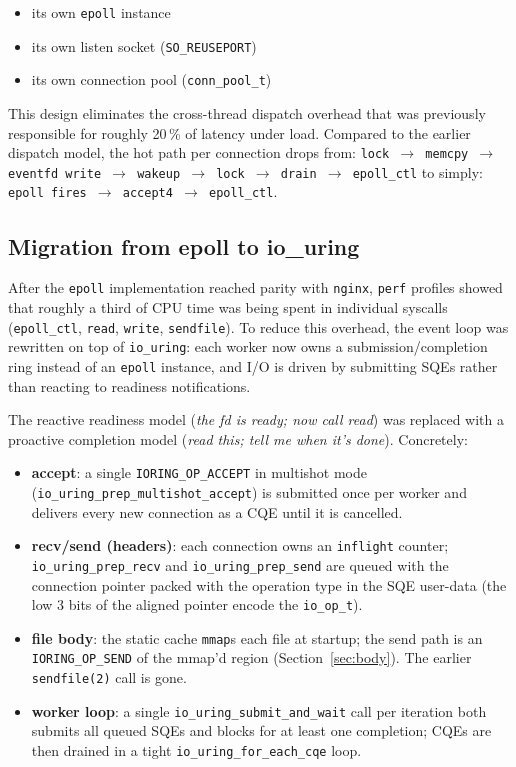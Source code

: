 \documentclass{article}
\begin{document}
\begin{itemize}
    \item its own \texttt{epoll} instance
    \item its own listen socket (\texttt{SO\_REUSEPORT})
    \item its own connection pool (\texttt{conn\_pool\_t})
\end{itemize}

This design eliminates the cross-thread dispatch overhead that was previously responsible for
roughly 20\,\% of latency under load. Compared to the earlier dispatch model, the hot path
per connection drops from: \texttt{lock $\to$ memcpy $\to$ eventfd write $\to$ wakeup $\to$
lock $\to$ drain $\to$ epoll\_ctl} to simply: \texttt{epoll fires $\to$ accept4 $\to$
epoll\_ctl}.

\subsection{Migration from epoll to io\_uring}
\label{sec:iouring}

After the \texttt{epoll} implementation reached parity with \texttt{nginx}, \texttt{perf} profiles showed that roughly a third of CPU time was being spent in individual syscalls (\texttt{epoll\_ctl}, \texttt{read}, \texttt{write}, \texttt{sendfile}). To reduce this overhead, the event loop was rewritten on top of \texttt{io\_uring}: each worker now owns a submission/completion ring instead of an \texttt{epoll} instance, and I/O is driven by submitting SQEs rather than reacting to readiness notifications.

The reactive readiness model (\emph{the fd is ready; now call read}) was replaced with a proactive completion model (\emph{read this; tell me when it's done}). Concretely:

\begin{itemize}
    \item \textbf{accept}: a single \texttt{IORING\_OP\_ACCEPT} in multishot mode
          (\texttt{io\_uring\_prep\_multishot\_accept}) is submitted once per worker and
          delivers every new connection as a CQE until it is cancelled.
    \item \textbf{recv/send (headers)}: each connection owns an \texttt{inflight}
          counter; \texttt{io\_uring\_prep\_recv} and \texttt{io\_uring\_prep\_send} are
          queued with the connection pointer packed with the operation type in the SQE
          user-data (the low 3 bits of the aligned pointer encode the \texttt{io\_op\_t}).
    \item \textbf{file body}: the static cache \texttt{mmap}s each file at startup; the
          send path is an \texttt{IORING\_OP\_SEND} of the mmap'd region
          (Section~\ref{sec:body}). The earlier \texttt{sendfile(2)} call is gone.
    \item \textbf{worker loop}: a single \texttt{io\_uring\_submit\_and\_wait} call per
          iteration both submits all queued SQEs and blocks for at least one completion;
          CQEs are then drained in a tight \texttt{io\_uring\_for\_each\_cqe} loop.
\end{itemize}
\end{document}
